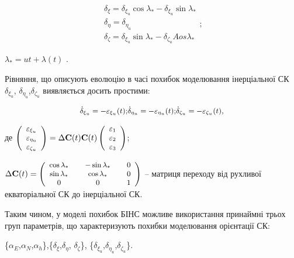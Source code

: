 \[\begin{array}{l} 
{\delta_{\xi } =\delta_{\xi_{u} } \cos\lambda_{*} -\delta_{\xi_{u} } \sin \lambda_{*} } \\ 
{\delta_{\eta } =\delta_{\eta_{u} }} \\ 
{\delta_{\zeta } =\delta_{\xi_{u} } \sin \lambda_{*} -\delta_{\zeta_{u} } Aos\lambda_{*} } \end{array};\] 
\begin{ESKDexplanation}
  $\lambda_{*} =ut+\lambda (t)$ .
\end{ESKDexplanation}
Рівняння, що описують еволюцію в часі похибок моделювання інерціальної СК $\delta_{\xi_{u} } $,
$\delta_{\eta_{u} } $,$\delta_{\zeta_{u} } $ виявляється досить простими:

\[\small
\begin{array}{l}{\dot{\delta }_{\xi_{u} } =-\varepsilon_{\xi_{u}} (t);} 
{\dot{\delta}_{\eta_{u} } =-\varepsilon_{\eta_{u} } (t);} 
{\dot{\delta}_{\zeta_{u} } =-\varepsilon_{\zeta_{u} } (t),} \end{array}\] 

де $\small
\left(\begin{array}{l} {\varepsilon_{\xi_{u} } } \\ 
{\varepsilon_{\eta_{{\rm u}} } } \\ 
{\varepsilon_{\zeta_{u} } } \end{array}\right)=\Delta {\bf C}(t){
\bf C}(t)\left(\begin{array}{l} {\varepsilon_{1} } \\ 
{\varepsilon_{2} } \\ 
{\varepsilon_{3} } \end{array}\right)$;

$\small \Delta {\bf C}(t)=\left(\begin{array}{ccccc} 
{\cos \lambda_{*} } & {} & {-\sin \lambda_{*} } & {} & {0} \\ 
{\sin \lambda_{*} } & {} & {\cos \lambda_{*} } & {} & {0} \\ 
{0} & {} & {0} & {} & {1} \end{array}\right)$ -- матриця переходу від рухливої  
екваторіальної СК до  інерціальної СК.

Таким чином, у моделі похибок БІНС можливе використання принаймні трьох груп параметрів, 
що характеризують похибки моделювання орієнтації СК:

\{$\alpha_{E} $,$\alpha_{N} $,$\alpha_{h} $\},\{$\delta_{\xi } $,$\delta_{\eta} $,
$\delta_{\zeta } $\}, \{$\delta_{\xi_{u} } $,$\delta_{\eta_{u}} $,$\delta_{\zeta_{u} } $\}.

